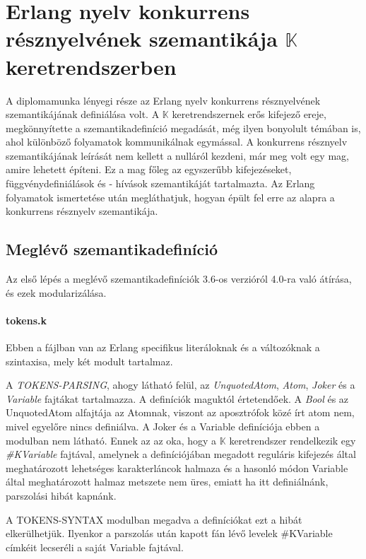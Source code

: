 \section{Erlang nyelv konkurrens résznyelvének szemantikája $\mathbb{K}$ keretrendszerben}
A diplomamunka lényegi része az Erlang nyelv konkurrens résznyelvének szemantikájának definiálása volt. A $\mathbb{K}$ keretrendszernek erős kifejező ereje, megkönnyítette a szemantikadefiníció megadását, még ilyen bonyolult témában is, ahol különböző folyamatok kommunikálnak egymással. A konkurrens résznyelv szemantikájának leírását nem kellett a nulláról kezdeni, már meg volt egy mag, amire lehetett építeni. Ez a mag főleg az egyszerűbb kifejezéseket, függvénydefiniálások és - hívások szemantikáját tartalmazta. Az Erlang folyamatok ismertetése után megláthatjuk, hogyan épült fel erre az alapra a konkurrens résznyelv szemantikája.

\subsection{Meglévő szemantikadefiníció}
Az első lépés a meglévő szemantikadefiníciók 3.6-os verzióról 4.0-ra való átírása, és ezek modularizálása.

\paragraph{tokens.k}
Ebben a fájlban van az Erlang specifikus literáloknak és a változóknak a szintaxisa, mely két modult tartalmaz.



A \textit{TOKENS-PARSING}, ahogy látható felül, az \textit{UnquotedAtom}, \textit{Atom}, \textit{Joker} és a \textit{Variable} fajtákat tartalmazza. A definíciók maguktól értetendőek. A \textit{Bool} és az UnquotedAtom alfajtája az Atomnak, viszont az aposztrófok közé írt atom nem, mivel egyelőre nincs definiálva. A Joker és a Variable definíciója ebben a modulban nem látható. Ennek az az oka, hogy a $\mathbb{K}$ keretrendszer rendelkezik egy \textit{\#KVariable} fajtával, amelynek a definíciójában megadott reguláris kifejezés által meghatározott lehetséges karakterláncok halmaza és a hasonló módon Variable által meghatározott halmaz metszete nem üres, emiatt ha itt definiálnánk, parszolási hibát kapnánk.
\newline


A TOKENS-SYNTAX modulban megadva a definíciókat ezt a hibát elkerülhetjük. Ilyenkor a parszolás után kapott fán lévő levelek \#KVariable címkéit lecseréli a saját Variable fajtával.

